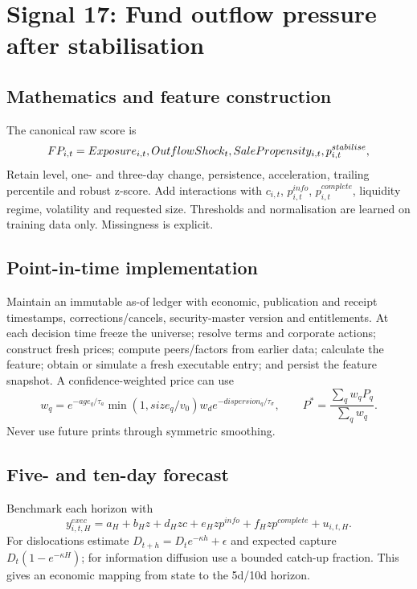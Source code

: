 \documentclass[10pt]{article}
\begin{document}
\section{Signal 17: Fund outflow pressure after stabilisation}
\subsection{Mathematics and feature construction}
The canonical raw score is
\begin{equation}FP_{i,t}=Exposure_{i,t}\\,OutflowShock_t\\,SalePropensity_{i,t}\\,p^{stabilise}_{i,t},\end{equation}
Retain level, one- and three-day change, persistence, acceleration, trailing percentile and robust z-score. Add interactions with $c_{i,t}$, $p^{info}_{i,t}$, $p^{complete}_{i,t}$, liquidity regime, volatility and requested size. Thresholds and normalisation are learned on training data only. Missingness is explicit.

\subsection{Point-in-time implementation}
Maintain an immutable as-of ledger with economic, publication and receipt timestamps, corrections/cancels, security-master version and entitlements. At each decision time freeze the universe; resolve terms and corporate actions; construct fresh prices; compute peers/factors from earlier data; calculate the feature; obtain or simulate a fresh executable entry; and persist the feature snapshot. A confidence-weighted price can use
\[w_q=e^{-age_q/\tau_a}\min(1,size_q/v_0)w_d e^{-dispersion_q/\tau_\sigma},\qquad P^*=\frac{\sum_qw_qP_q}{\sum_qw_q}.\]
Never use future prints through symmetric smoothing.

\subsection{Five- and ten-day forecast}
Benchmark each horizon with
\[y^{exec}_{i,t,H}=a_H+b_Hz+d_Hzc+e_Hzp^{info}+f_Hzp^{complete}+u_{i,t,H}.\]
For dislocations estimate $D_{t+h}=D_te^{-\kappa h}+\epsilon$ and expected capture $D_t(1-e^{-\kappa H})$; for information diffusion use a bounded catch-up fraction. This gives an economic mapping from state to the 5d/10d horizon.
\end{document}
